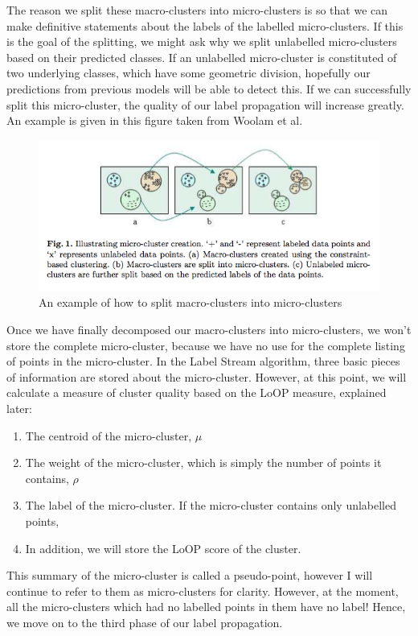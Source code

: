 \documentclass[12pt,a4paper,oneside]{report}
\begin{document}
The reason we split these macro-clusters into micro-clusters is so that we can make definitive statements about the labels of the labelled micro-clusters. If this is the goal of the splitting, we might ask why we split unlabelled micro-clusters based on their predicted classes. If an unlabelled micro-cluster is constituted of two underlying classes, which have some geometric division, hopefully our predictions from previous models will be able to detect this. If we can successfully split this micro-cluster, the quality of our label propagation will increase greatly. An example is given in this figure taken from Woolam et al\cite{LabStr}.
\begin{figure}
	\includegraphics[scale = 0.7]{ClusterSplitting}
	\caption{An example of how to split macro-clusters into micro-clusters}
\end{figure}
Once we have finally decomposed our macro-clusters into micro-clusters, we won't store the complete micro-cluster, because we have no use for the complete listing of points in the micro-cluster. In the Label Stream algorithm, three basic pieces of information are stored about the micro-cluster. However, at this point, we will calculate a measure of cluster quality based on the LoOP measure, explained later:
\begin{enumerate}
\item The centroid of the micro-cluster, \(\mu\)
\item The weight of the micro-cluster, which is simply the number of points it contains, \(\rho\)
\item The label of the micro-cluster. If the micro-cluster contains only unlabelled points,  
\item In addition, we will store the LoOP score of the cluster.
\end{enumerate}

This summary of the micro-cluster is called a pseudo-point, however I will continue to refer to them as micro-clusters for clarity. However, at the moment, all the micro-clusters which had no labelled points in them have no label! Hence, we move on to the third phase of our label propagation. 
\end{document}
